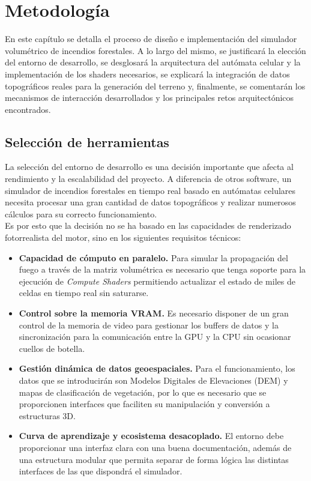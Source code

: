\lstset{style=GDS}


\chapter{Metodología} \label{03_Metodología}

En este capítulo se detalla el proceso de diseño e implementación del simulador volumétrico de incendios forestales. A lo largo del mismo, se justificará la elección del entorno de desarrollo, se desglosará la arquitectura del autómata celular y la implementación de los shaders necesarios, se explicará la integración de datos topográficos reales para la generación del terreno y, finalmente, se comentarán los mecanismos de interacción desarrollados y los principales retos arquitectónicos encontrados.
\section{Selección de herramientas}

La selección del entorno de desarrollo es una decisión importante que afecta al rendimiento y la escalabilidad del proyecto. A diferencia de otros software, un simulador de incendios forestales en tiempo real basado en autómatas celulares necesita procesar una gran cantidad de datos topográficos y realizar numerosos cálculos para su correcto funcionamiento.\\

Es por esto que la decisión no se ha basado en las capacidades de renderizado fotorrealista del motor, sino en los siguientes requisitos técnicos:
\begin{itemize}
    \item \textbf{Capacidad de cómputo en paralelo.} Para simular la propagación del fuego a través de la matriz volumétrica es necesario que tenga soporte para la ejecución de \textit{Compute Shaders} permitiendo actualizar el estado de miles de celdas en tiempo real sin saturarse.
    
    \item \textbf{Control sobre la memoria VRAM.} Es necesario disponer de un gran control de la memoria de video para gestionar los buffers de datos y la sincronización para la comunicación entre la GPU y la CPU sin ocasionar cuellos de botella.
    
    \item \textbf{Gestión dinámica de datos geoespaciales.} Para el funcionamiento, los datos que se introducirán son Modelos Digitales de Elevaciones (DEM) y mapas de clasificación de vegetación, por lo que es necesario que se proporcionen interfaces que faciliten su manipulación y conversión a estructuras 3D.

    \item \textbf{Curva de aprendizaje y ecosistema desacoplado.} El entorno debe proporcionar una interfaz clara con una buena documentación, además de una estructura modular que permita separar de forma lógica las distintas interfaces de las que dispondrá el simulador.
    
\end{itemize}

